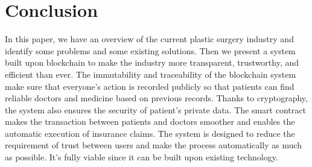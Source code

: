 \documentclass{article}
\begin{document}
\section{Conclusion}
In this paper, we have an overview of the current plastic surgery industry and identify some problems and some existing solutions. Then we present a system built upon blockchain to make the industry more transparent, trustworthy, and efficient than ever. The immutability and traceability of the blockchain system make sure that everyone's action is recorded publicly so that patients can find reliable doctors and medicine based on previous records. Thanks to cryptography, the system also ensures the security of patient's private data. The smart contract makes the transaction between patients and doctors smoother and enables the automatic execution of insurance claims. The system is designed to reduce the requirement of trust between users and make the process automatically as much as possible. It's fully viable since it can be built upon existing technology. 


\end{document}
